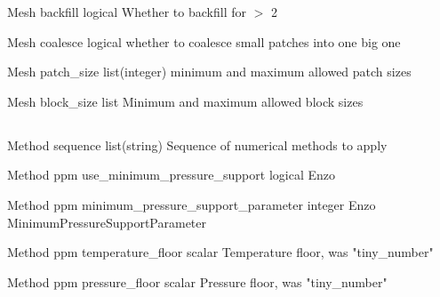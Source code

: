 \documentclass{book}
\begin{document}
\Parameter
{Mesh}
{}
{backfill}
{logical}
{}
{Whether to backfill for  $>$ 2}
{}
{}

\Parameter
{Mesh}
{}
{coalesce}
{logical}
{}
{whether to coalesce small patches into one big one}
{}
{}

\Parameter
{Mesh}
{}
{patch\_size}
{list(integer)}
{}
{minimum and maximum allowed patch sizes}
{}
{}

\Parameter
{Mesh}
{}
{block\_size}
{list}
{}
{Minimum and maximum allowed block sizes}
{}
{}

\subsection{}

\Parameter
{Method}
{}
{sequence}
{list(string)}
{}
{Sequence of numerical methods to apply}
{}
{}

\Parameter
{Method}
{ppm}
{use\_minimum\_pressure\_support}
{logical}
{}
{Enzo }
{}
{}
 	 	 	 	
\Parameter
{Method}
{ppm}
{minimum\_pressure\_support\_parameter}
{integer}
{}
{Enzo MinimumPressureSupportParameter}
{}
{}

 	 	 	 	
\Parameter
{Method}
{ppm}
{temperature\_floor}
{scalar}
{}
{Temperature floor, was "tiny\_number"}
{}
{}

 	 	 	 	
\Parameter
{Method}
{ppm}
{pressure\_floor}
{scalar}
{}
{Pressure floor, was "tiny\_number"}
{}
{}
\end{document}
